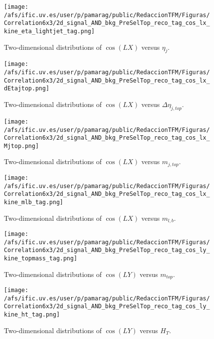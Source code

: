 \begin{figure}[h]
\centering
\texttt{[image: /afs/ific.uv.es/user/p/pamarag/public/RedaccionTFM/Figuras/Correlation6x3/2d\_signal\_AND\_bkg\_PreSelTop\_reco\_tag\_cos\_lx\_kine\_eta\_lightjet\_tag.png]}
\caption{Two-dimensional distributions of $\cos(LX)$ versus $\eta_{j}$.}
\end{figure}

\begin{figure}[h]
\centering
\texttt{[image: /afs/ific.uv.es/user/p/pamarag/public/RedaccionTFM/Figuras/Correlation6x3/2d\_signal\_AND\_bkg\_PreSelTop\_reco\_tag\_cos\_lx\_dEtajtop.png]}
\caption{Two-dimensional distributions of $\cos(LX)$ versus $\Delta\eta_{j,top}$.}
\end{figure}

\newpage

\begin{figure}[h]
\centering
\texttt{[image: /afs/ific.uv.es/user/p/pamarag/public/RedaccionTFM/Figuras/Correlation6x3/2d\_signal\_AND\_bkg\_PreSelTop\_reco\_tag\_cos\_lx\_Mjtop.png]}
\caption{Two-dimensional distributions of $\cos(LX)$ versus $m_{j,top}$.}
\end{figure}


\begin{figure}[h]
\centering
\texttt{[image: /afs/ific.uv.es/user/p/pamarag/public/RedaccionTFM/Figuras/Correlation6x3/2d\_signal\_AND\_bkg\_PreSelTop\_reco\_tag\_cos\_lx\_kine\_mlb\_tag.png]}
\caption{Two-dimensional distributions of $\cos(LX)$ versus $m_{l,b}$.}
\label{Fig:mlbVScosLX}
\end{figure}

\begin{figure}[h]
\centering
\texttt{[image: /afs/ific.uv.es/user/p/pamarag/public/RedaccionTFM/Figuras/Correlation6x3/2d\_signal\_AND\_bkg\_PreSelTop\_reco\_tag\_cos\_ly\_kine\_topmass\_tag.png]}
\caption{Two-dimensional distributions of $\cos(LY)$ versus $m_{top}$.}
\label{Fig:YA}
\end{figure}


\begin{figure}[h]
\centering
\texttt{[image: /afs/ific.uv.es/user/p/pamarag/public/RedaccionTFM/Figuras/Correlation6x3/2d\_signal\_AND\_bkg\_PreSelTop\_reco\_tag\_cos\_ly\_kine\_ht\_tag.png]}
\caption{Two-dimensional distributions of $\cos(LY)$ versus $H_T$.}
\end{figure}


